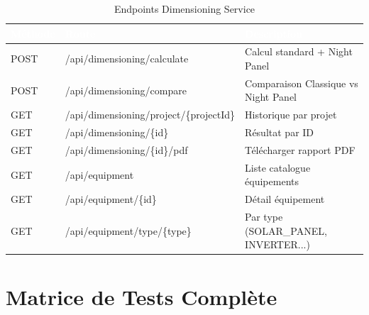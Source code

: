 \begin{table}[H]
  \caption{Endpoints Dimensioning Service}
  \centering
  \begin{tabularx}{\textwidth}{|C{1.5cm}|L{6cm}|X|}
    \hline
    \textcolor{white}{\textbf{Méthode}} &
    \textcolor{white}{\textbf{Route}} &
    \textcolor{white}{\textbf{Description}} \\
    \hline
    POST & /api/dimensioning/calculate & Calcul standard + Night Panel \\
    \hline
    POST & /api/dimensioning/compare & Comparaison Classique vs Night Panel \\
    \hline
    GET & /api/dimensioning/project/\{projectId\} & Historique par projet \\
    \hline
    GET & /api/dimensioning/\{id\} & Résultat par ID \\
    \hline
    GET & /api/dimensioning/\{id\}/pdf & Télécharger rapport PDF \\
    \hline
    GET & /api/equipment & Liste catalogue équipements \\
    \hline
    GET & /api/equipment/\{id\} & Détail équipement \\
    \hline
    GET & /api/equipment/type/\{type\} & Par type (SOLAR\_PANEL, INVERTER...) \\
    \hline
  \end{tabularx}
\end{table}

\chapter{Matrice de Tests Complète}

